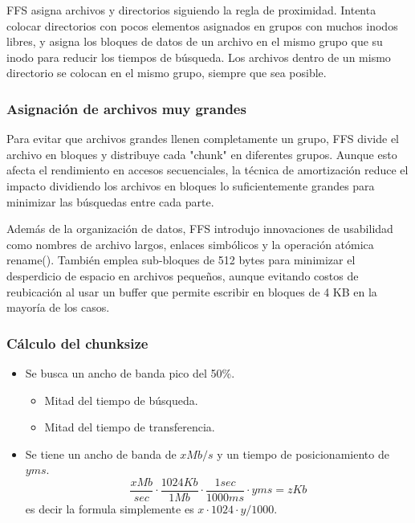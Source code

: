 \documentclass[openany]{book}
\begin{document}
FFS asigna archivos y directorios siguiendo la regla de proximidad. Intenta colocar directorios con \colorbox{blue!20}{pocos} \colorbox{blue!20}{elementos} asignados en grupos con muchos \colorbox{blue!20}{inodos libres}, y asigna los bloques de datos de un archivo en el \colorbox{blue!20}{mismo grupo} que su \colorbox{blue!20}{inodo} para reducir los tiempos de búsqueda. Los archivos dentro de un \colorbox{blue!20}{mismo directorio} se colocan en el \colorbox{blue!20}{mismo grupo}, siempre que sea posible.

\subsubsection{Asignación de archivos muy grandes}

Para evitar que archivos grandes llenen completamente un grupo, FFS divide el archivo en bloques y \colorbox{blue!20}{distribuye} cada "chunk" en diferentes grupos. Aunque esto \colorbox{blue!20}{afecta el rendimiento} en accesos secuenciales, la técnica de \colorbox{blue!20}{amortización} reduce el impacto dividiendo los archivos en bloques lo suficientemente grandes para minimizar las búsquedas entre cada parte.

Además de la organización de datos, FFS introdujo innovaciones de usabilidad como nombres de archivo largos, enlaces simbólicos y la operación atómica rename(). También emplea sub-bloques de 512 bytes para minimizar el desperdicio de espacio en archivos pequeños, aunque evitando costos de reubicación al usar un buffer que permite escribir en bloques de 4 KB en la mayoría de los casos.

\subsubsection{Cálculo del chunksize}
\begin{itemize}
    \item Se busca un ancho de banda pico del 50\%.
    \begin{itemize}
        \item Mitad del tiempo de búsqueda.
        \item Mitad del tiempo de transferencia.
    \end{itemize}
    \item Se tiene un ancho de banda de $xMb/s$ y un tiempo de posicionamiento de $yms$.
    \begin{equation*}
        \frac{x Mb}{sec} \cdot \frac{1024 Kb}{1Mb} \cdot \frac{1 sec}{1000 ms} \cdot y ms = z Kb
    \end{equation*}
    es decir la formula simplemente es $x \cdot 1024 \cdot y / 1000$.
\end{itemize}
\end{document}
